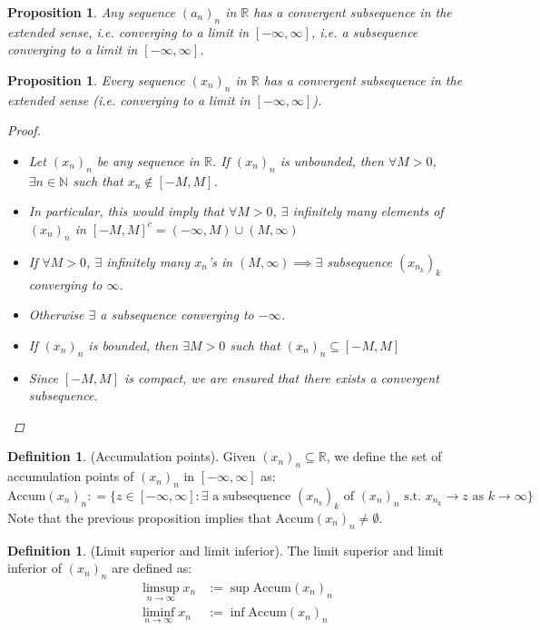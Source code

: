 \documentclass[10pt]{article}
\newcommand{\N}{\mathbb{N}}
\newcommand{\R}{\mathbb{R}}
\newtheorem{proposition}[theorem]{Proposition}
\theoremstyle{definition}
\newtheorem{definition}[theorem]{Definition}
\theoremstyle{remark}
\begin{document}
\begin{proposition}
    Any sequence $(a_n)_n$ in $\R$ has a convergent subsequence in the extended sense, i.e. 
    converging to a limit in $[-\infty, \infty]$, i.e. a subsequence converging to a limit in $[-\infty, \infty]$.
\end{proposition}

\begin{proposition}
    Every sequence $(x_n)_n$ in $\R$ has a convergent subsequence in the extended sense (i.e. converging to a limit in $[-\infty, \infty]$).
    \begin{proof}
        \hfill
        \begin{itemize}
            \item Let $(x_n)_n$ be any sequence in $\R$. If $(x_n)_n$ is unbounded, then $\forall M > 0$, $\exists n \in \N$ such that $x_n \not\in [-M, M]$.
            \item In particular, this would imply that $\forall M > 0$, $\exists$ infinitely many elements of $(x_n)_n$ in $[-M, M]^c = (-\infty, M) \cup (M, \infty)$
            \item If $\forall M > 0$, $\exists$ infinitely many $x_n$'s in $(M, \infty) \implies \exists$ subsequence $(x_{n_k})_k$ converging to $\infty$.
            \item Otherwise $\exists$ a subsequence converging to $-\infty$.
            \item If $(x_n)_n$ is bounded, then $\exists M > 0$ such that $(x_n)_n \subseteq [-M, M]$
            \item Since $[-M, M]$ is compact, we are ensured that there exists a convergent subsequence.
        \end{itemize}
    \end{proof}
\end{proposition}

\begin{definition}
    (Accumulation points).
    Given $(x_n)_n \subseteq \R$, we define the set of accumulation points of $(x_n)_n$ in $[-\infty, \infty]$ as:
    $$\text{Accum}(x_n)_n : = \{z \in [-\infty, \infty] : \exists \text{ a subsequence } (x_{n_k})_k \text{ of } (x_n)_n \text{ s.t. } x_{n_k} \to z \text{ as } k \to \infty \}$$
    Note that the previous proposition implies that $\text{Accum}(x_n)_n \neq \emptyset$.
\end{definition}

\begin{definition}
    (Limit superior and limit inferior).
    The limit superior and limit inferior of $(x_n)_n$ are defined as:
    \begin{align*}
        \limsup_{n \to \infty} x_n &:= \sup \text{Accum}(x_n)_n \\
        \liminf_{n \to \infty} x_n &:= \inf \text{Accum}(x_n)_n
    \end{align*}
\end{definition}
\end{document}
